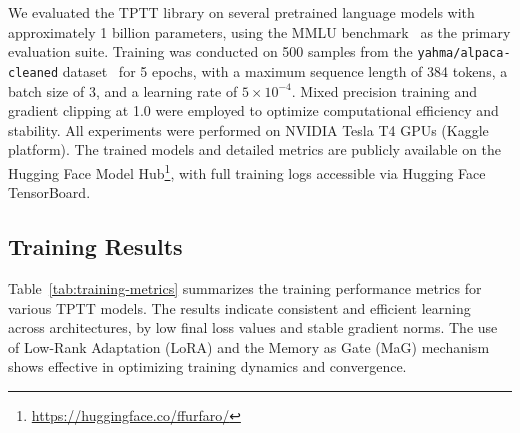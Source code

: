 \documentclass[10pt,a4paper]{article}
\begin{document}
We evaluated the TPTT library on several pretrained language models with approximately 1 billion parameters, using the MMLU benchmark~\cite{hendrycks2020measuring} as the primary evaluation suite. Training was conducted on 500 samples from the \texttt{yahma/alpaca-cleaned} dataset~\cite{taori2023alpaca} for 5 epochs, with a maximum sequence length of 384 tokens, a batch size of 3, and a learning rate of $5 \times 10^{-4}$. Mixed precision training and gradient clipping at 1.0 were employed to optimize computational efficiency and stability. All experiments were performed on NVIDIA Tesla T4 GPUs (Kaggle platform). The trained models and detailed metrics are publicly available on the Hugging Face Model Hub\footnote{\url{https://huggingface.co/ffurfaro/}}, with full training logs accessible via Hugging Face TensorBoard.

\subsection{Training Results}

Table~\ref{tab:training-metrics} summarizes the training performance metrics for various TPTT models. The results indicate consistent and efficient learning across architectures, by low final loss values and stable gradient norms. The use of Low-Rank Adaptation (LoRA) and the Memory as Gate (MaG) mechanism shows effective in optimizing training dynamics and convergence.

\begin{table}[h!]
    \centering
    \caption{Training performance metrics for TPTT models.}
    \label{tab:training-metrics}
\end{table}
\end{document}
